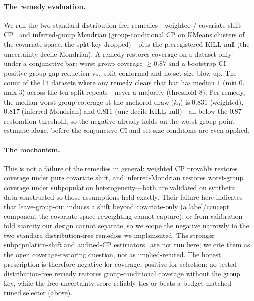\documentclass[11pt]{article}
\begin{document}
\paragraph{The remedy evaluation.} We run the two standard distribution-free remedies---weighted /
covariate-shift CP~\citep{tibshirani2019covariate} and inferred-group Mondrian (group-conditional CP on
KMeans clusters of the covariate space, the split key dropped)---plus the preregistered KILL null
(the uncertainty-decile Mondrian). A remedy restores coverage on a dataset only under a
conjunctive bar: worst-group coverage $\geq0.87$ and a bootstrap-CI-positive group-gap
reduction vs.\ split conformal and no set-size blow-up. The count of the 14 datasets where any
remedy clears that bar has median $1$ (min $0$, max $3$) across the ten split-repeats---never a majority
(threshold $8$). Per remedy, the median worst-group coverage at the anchored draw ($k_0$) is $0.831$
(weighted), $0.817$ (inferred-Mondrian) and $0.811$ (unc-decile KILL null)---all below the $0.87$
restoration threshold, so the negative already holds on the worst-group point estimate alone, before
the conjunctive CI and set-size conditions are even applied.

\paragraph{The mechanism.} This is not a failure of the remedies in general: weighted CP provably restores
coverage under pure covariate shift, and inferred-Mondrian restores worst-group coverage under subpopulation
heterogeneity---both are validated on synthetic data constructed so those assumptions hold exactly.
Their failure here indicates that leave-group-out
induces a shift beyond covariate-only (a label/concept component the covariate-space reweighting cannot
capture), or from calibration-fold scarcity our design cannot separate, so we scope the negative narrowly
to the two standard distribution-free remedies we implemented. The stronger subpopulation-shift and audited-CP
estimators~\citep{subpop2025conformal,audited2026conformal} are not run here; we cite them as the open
coverage-restoring question, not as implied-refuted. The honest prescription is therefore negative for
coverage, positive for selection: no tested distribution-free remedy restores group-conditional coverage
without the group key, while the free uncertainty score reliably ties-or-beats a budget-matched tuned selector
(above).
\end{document}
